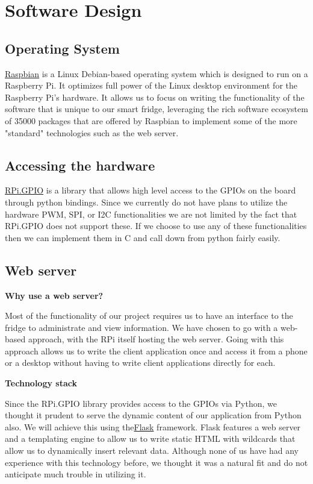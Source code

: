 \documentclass[10pt]{article}
\begin{document}
\newpage
\section{Software Design}
\subsection{Operating System}
\hyperref[https://www.raspbian.org/]{Raspbian} is a Linux Debian-based operating system which is designed to run on a Raspberry Pi. It optimizes full power of the Linux desktop environment for the Raspberry Pi's hardware. It allows us to focus on writing the functionality of the software that is unique to our smart fridge, leveraging the rich software ecosystem of 35000 packages that are offered by Raspbian to implement some of the more "standard" technologies such as the web server.

\subsection{Accessing the hardware}
\hyperref[https://pypi.python.org/pypi/RPi.GPIO]{RPi.GPIO} is a library that allows high level access to the GPIOs on the board through python bindings. Since we currently do not have plans to utilize the hardware PWM, SPI, or I2C functionalities we are not limited by the fact that RPi.GPIO does not support these. If we choose to use any of these functionalities then we can implement them in C and call down from python fairly easily.

\subsection{Web server}
\textbf{Why use a web server?}

Most of the functionality of our project requires us to have an interface to the fridge to administrate and view information. We have chosen to go with a web-based approach, with the RPi itself hosting the web server. Going with this approach allows us to write the client application once and access it from a phone or a desktop without having to write client applications directly for each.

\textbf{Technology stack}

Since the RPi.GPIO library provides access to the GPIOs via Python, we thought it prudent to serve the dynamic content of our application from Python also. We will achieve this using the\hyperref[http://flask.pocoo.org/]{Flask} framework. Flask features a web server and a templating engine to allow us to write static HTML with wildcards that allow us to dynamically insert relevant data. Although none of us have had any experience with this technology before, we thought it was a natural fit and do not anticipate much trouble in utilizing it.
\end{document}
